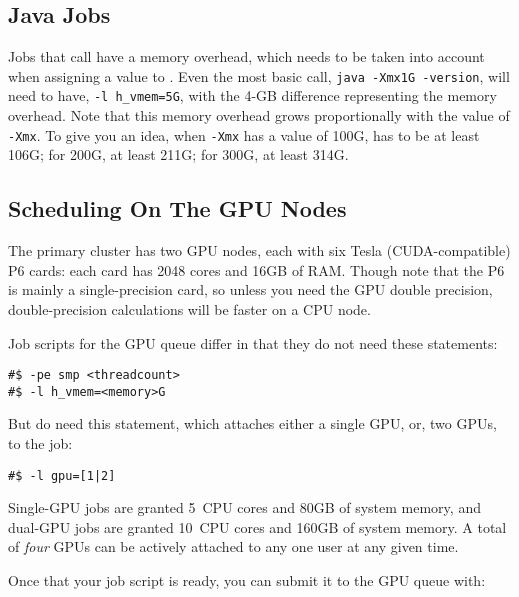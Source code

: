 \subsection{Java Jobs}

Jobs that call  have a memory overhead, which needs to be taken 
into account when assigning a value to . Even the most basic 
 call, \texttt{java -Xmx1G -version}, will need to have,
\texttt{-l h\_vmem=5G}, with the 4-GB difference representing the memory overhead. 
Note that this memory overhead grows proportionally with the value of
\texttt{-Xmx}. To give you an idea, when \texttt{-Xmx} has a value of 100G,
 has to be at least 106G; for 200G, at least 211G; for 300G, at least 314G.


\subsection{Scheduling On The GPU Nodes}

The primary cluster has two GPU nodes, each with six Tesla (CUDA-compatible) P6
cards: each card has 2048 cores and 16GB of RAM. Though note that the P6
is mainly a single-precision card, so unless you need the GPU double
precision, double-precision calculations will be faster on a CPU node.

Job scripts for the GPU queue differ in that they do not need these
statements:

\begin{verbatim}
#$ -pe smp <threadcount>
#$ -l h_vmem=<memory>G
\end{verbatim}

But do need this statement, which attaches either a single GPU, or, two
GPUs, to the job:

\begin{verbatim}
#$ -l gpu=[1|2]
\end{verbatim}

Single-GPU jobs are granted 5~CPU cores and 80GB of system memory, and
dual-GPU jobs are granted 10~CPU cores and 160GB of system memory. A
total of \emph{four} GPUs can be actively attached to any one user at any given
time.

Once that your job script is ready, you can submit it to the GPU queue
with:

